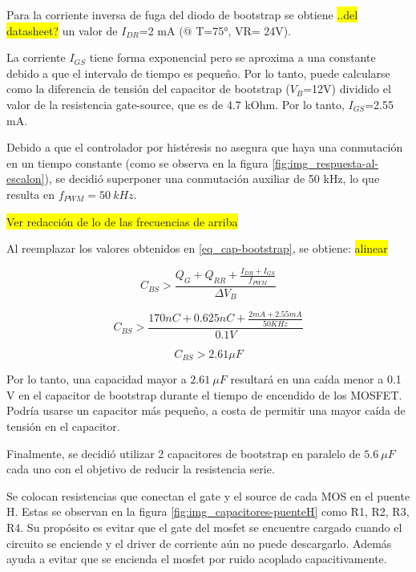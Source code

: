 \noindent Para la corriente inversa de fuga del diodo de bootstrap se obtiene \colorbox{yellow}{..del datasheet?} un valor de $I_{DR}$=2 mA (@ T=75°, VR= 24V).

\noindent La corriente $I_{GS}$ tiene forma exponencial pero se aproxima a una constante debido a que el intervalo de tiempo es pequeño. Por lo tanto, puede calcularse como la diferencia de tensión del capacitor de bootstrap ($V_B$=12V) dividido el valor de la resistencia gate-source, que es de 4.7 kOhm. Por lo tanto, $I_{GS}$=2.55 mA. 

\noindent Debido a que el controlador por histéresis no asegura que haya una conmutación en un tiempo constante (como se observa en la figura \ref{fig:img_respuesta-al-escalon}), se decidió superponer una conmutación auxiliar de 50 kHz, lo que resulta en $f_{PWM}=50 \:kHz$. 

\colorbox{yellow}{Ver redacción de lo de las frecuencias de arriba}

\noindent Al reemplazar los valores obtenidos en \ref{eq_cap-bootstrap}, se obtiene: \colorbox{yellow}{alinear}

\begin{equation*} 
C_{BS} > \frac{Q_G+Q_{RR} + \frac{I_{DR}+I_{GS}}{f_{PWM}}}{\Delta V_B}
\end{equation*}

\begin{equation*} 
	C_{BS} > \frac{170 nC + 0.625nC + \frac{2 mA + 2.55 mA}{50 KHz}}{0.1 V}
\end{equation*}

\begin{equation*} 
	C_{BS} > 2.61 \mu F
\end{equation*}



\noindent Por lo tanto, una capacidad mayor a $2.61 \:\mu F$ resultará en una caída menor a 0.1 V en el capacitor de bootstrap durante el tiempo de encendido de los MOSFET. Podría usarse un capacitor más pequeño, a costa de permitir una mayor caída de tensión en el capacitor. 

\noindent Finalmente, se decidió utilizar 2 capacitores de bootstrap en paralelo de $5.6 \:\mu F$ cada uno con el objetivo de reducir la resistencia serie.



\noindent Se colocan resistencias que conectan el gate y el source de cada MOS en el puente H. Estas se observan en la figura \ref{fig:img_capacitores-puenteH} como R1, R2, R3, R4. Su propósito es evitar que el gate del mosfet se encuentre cargado cuando el circuito se enciende y el driver de corriente aún no puede descargarlo. Además ayuda a evitar que se encienda el mosfet por ruido acoplado capacitivamente. 

